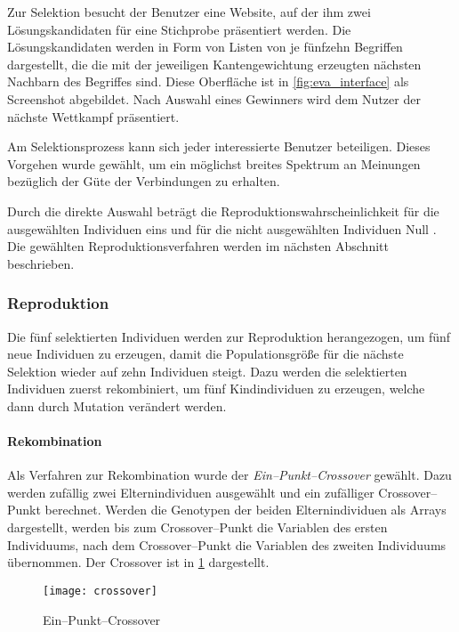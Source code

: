 Zur Selektion besucht der Benutzer eine Website, auf der ihm zwei Lösungskandidaten für eine Stichprobe präsentiert werden. Die Lösungskandidaten werden in Form von Listen von je fünfzehn Begriffen dargestellt, die die mit der jeweiligen Kantengewichtung erzeugten nächsten Nachbarn des Begriffes sind. Diese Oberfläche ist in \cref{fig:eva_interface} als Screenshot abgebildet. Nach Auswahl eines Gewinners wird dem Nutzer der nächste Wettkampf präsentiert.

Am Selektionsprozess kann sich jeder interessierte Benutzer beteiligen. Dieses Vorgehen wurde gewählt, um ein möglichst breites Spektrum an Meinungen bezüglich der Güte der Verbindungen zu erhalten.

Durch die direkte Auswahl beträgt die Reproduktionswahrscheinlichkeit für die ausgewählten Individuen eins und für die nicht ausgewählten Individuen Null \cite{sd2012}. Die gewählten Reproduktionsverfahren werden im nächsten Abschnitt beschrieben.

\subsubsection{Reproduktion}

Die fünf selektierten Individuen werden zur Reproduktion herangezogen, um fünf neue Individuen zu erzeugen, damit die Populationsgröße für die nächste Selektion wieder auf zehn Individuen steigt. Dazu werden die selektierten Individuen zuerst rekombiniert, um fünf Kindindividuen zu erzeugen, welche dann durch Mutation verändert werden.

\paragraph{Rekombination}

Als Verfahren zur Rekombination wurde der \emph{Ein--Punkt--Crossover} \cite{kw2007} gewählt. Dazu werden zufällig zwei Elternindividuen ausgewählt und ein zufälliger Crossover--Punkt berechnet. Werden die Genotypen der beiden Elternindividuen als Arrays dargestellt, werden bis zum Crossover--Punkt die Variablen des ersten Individuums, nach dem Crossover--Punkt die Variablen des zweiten Individuums übernommen. Der Crossover ist in \cref{fig:crossover} dargestellt.

\begin{figure}
\centering
\texttt{[image: crossover]}
\caption{Ein--Punkt--Crossover}
\label{fig:crossover}
\end{figure}

